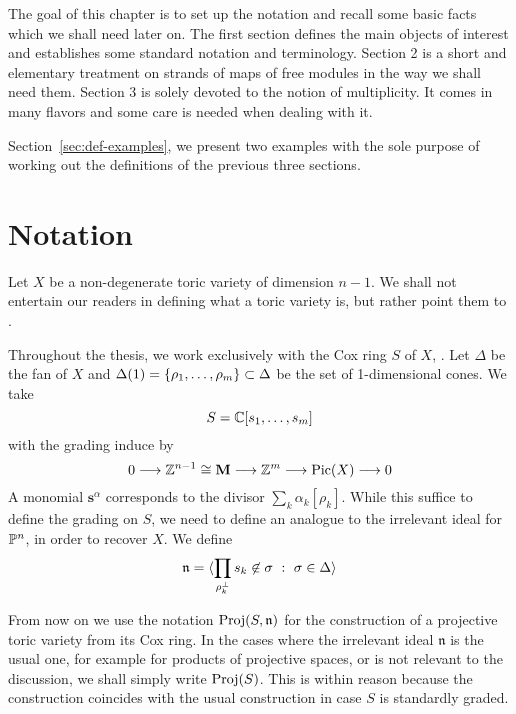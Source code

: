 \documentclass[fleqn,reqno]{amsart}
\begin{document}



\begin{paragraf*}
The goal of this chapter is to set up the notation and recall some basic facts
which we shall need later on.
The first section defines the main objects of interest and establishes some
standard notation and terminology.
Section 2 is a short and elementary treatment on strands of maps of free modules
in the way we shall need them.
Section 3 is solely devoted to the notion of multiplicity.
It comes in many flavors and some care is needed when dealing with it.
\end{paragraf*}

\begin{paragraf*}
Section~\ref{sec:def-examples}, we present two examples with the sole purpose
of working out the definitions of the previous three sections.
\end{paragraf*}



\section{Notation}
\label{sec:notation}

\begin{paragraf}
\label{par:cox-ring}
Let $X$ be a non-degenerate toric variety of dimension $n-1$.
We shall not entertain our readers in defining what a toric variety is,
but rather point them to \citet{CLSh11}.

Throughout the thesis,
we work exclusively with the Cox ring $S$ of $X$, \citet{Cox-93}.
Let $\Delta$ be the fan of $X$ and
$\Delta(1)=\{\rho_1,\ldots,\rho_m\}\subset\Delta$ be the set of 1-dimensional cones.
We take
\[
	S=\mathbb{C}[s_1,\ldots,s_m]
\]
with the grading induce by
\[
	0\longrightarrow\mathbb{Z}^{n-1}\cong\mathbf M\longrightarrow\mathbb{Z}^m\longrightarrow\operatorname{Pic}(X)\longrightarrow0
\]
A monomial $\mathbf s^\alpha$ corresponds to the divisor $\sum_k \alpha_k[\rho_k]$.
While this suffice to define the grading on $S$,
we need to define an analogue to the irrelevant ideal for $\mathbb{P}^n$,
in order to recover $X$.
We define
\[
	\mathfrak{n}=\langle \prod_{\rho_k^\perp}s_k\not\in\sigma~:~\sigma\in\Delta\rangle
\]
\end{paragraf}

\begin{paragraf}
From now on we use the notation $\operatorname{Proj}(S,\mathfrak n)$ for the construction of a projective toric variety from
its Cox ring. In the cases where the irrelevant ideal $\mathfrak n$ is the usual one,
for example for products of projective spaces, or is not relevant to the discussion,
we shall simply write $\operatorname{Proj}(S)$.
This is within reason because the construction coincides with the usual construction
in case $S$ is standardly graded.
\end{paragraf}
\end{document}
